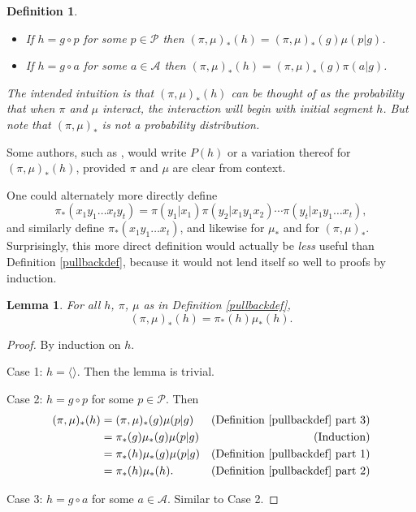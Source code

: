 \documentclass{article}
\newtheorem{definition}[theorem]{Definition}
\newtheorem{lemma}[theorem]{Lemma}
\begin{document}
\begin{definition}
\begin{enumerate}
\begin{itemize}
            \item
            If $h=g\circ p$ for some $p\in\mathcal P$ then
            $(\pi,\mu)_*(h)=(\pi,\mu)_*(g)\mu(p|g)$.
            \item
            If $h=g\circ a$ for some $a\in\mathcal A$ then
            $(\pi,\mu)_*(h)=(\pi,\mu)_*(g)\pi(a|g)$.
        \end{itemize}
        The intended intuition is that $(\pi,\mu)_*(h)$ can be thought of as
        the probability that when $\pi$ and $\mu$ interact, the interaction
        will begin with initial segment $h$. But note that
        $(\pi,\mu)_*$ is \emph{not} a probability distribution.
    \end{enumerate}
\end{definition}

Some authors, such as \cite{hutter2009discrete}, would write $P(h)$ or a variation thereof
for $(\pi,\mu)_*(h)$, provided $\pi$ and $\mu$ are clear from context.

One could alternately more directly define
\[
    \pi_*(x_1y_1\ldots x_ty_t)
    = \pi(y_1|x_1)\pi(y_2|x_1y_1x_2)\cdots \pi(y_t|x_1y_1\ldots x_t),
\]
and similarly define $\pi_*(x_1y_1\ldots x_t)$,
and likewise for $\mu_*$ and for $(\pi,\mu)_*$. Surprisingly, this more
direct definition would actually be \emph{less} useful than
Definition \ref{pullbackdef}, because it would not lend itself so well
to proofs by induction.

\begin{lemma}
\label{factorizationlemma}
    For all $h$, $\pi$, $\mu$ as in Definition \ref{pullbackdef},
    \[
        (\pi,\mu)_*(h) = \pi_*(h)\mu_*(h).
    \]
\end{lemma}

\begin{proof}
    By induction on $h$.

    Case 1: $h=\langle\rangle$. Then the lemma is trivial.

    Case 2: $h=g\circ p$ for some $p\in\mathcal P$.
        Then
        \begin{align*}
            (\pi,\mu)_*(h)
                &= (\pi,\mu)_*(g)\mu(p|g)
                    &\mbox{(Definition \ref{pullbackdef} part 3)}\\
                &= \pi_*(g)\mu_*(g)\mu(p|g)
                    &\mbox{(Induction)}\\
                &= \pi_*(h)\mu_*(g)\mu(p|g)
                    &\mbox{(Definition \ref{pullbackdef} part 1)}\\
                &= \pi_*(h)\mu_*(h).
                    &\mbox{(Definition \ref{pullbackdef} part 2)}
        \end{align*}

    Case 3: $h=g\circ a$ for some $a\in\mathcal A$.
        Similar to Case 2.
\end{proof}
\end{document}
